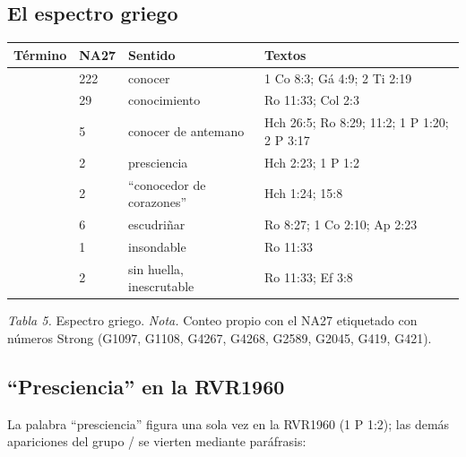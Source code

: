\subsection{El espectro griego}

\begin{center}\small\renewcommand{\arraystretch}{1.2}
\begin{tabular}{@{}L{3.0cm}L{1.0cm}L{4.4cm}L{6.0cm}@{}}
\toprule
\textbf{Término} & \textbf{NA27} & \textbf{Sentido} & \textbf{Textos} \\ \midrule
{} & 222 & conocer & 1 Co 8:3; Gá 4:9; 2 Ti 2:19 \\
 & 29 & conocimiento & Ro 11:33; Col 2:3 \\
 & 5 & conocer de antemano & Hch 26:5; Ro 8:29; 11:2; 1 P 1:20; 2 P 3:17 \\
 & 2 & presciencia & Hch 2:23; 1 P 1:2 \\
 & 2 & ``conocedor de corazones'' & Hch 1:24; 15:8 \\
 & 6 & escudriñar & Ro 8:27; 1 Co 2:10; Ap 2:23 \\
 & 1 & insondable & Ro 11:33 \\
 & 2 & sin huella, inescrutable & Ro 11:33; Ef 3:8 \\
\bottomrule
\end{tabular}\par
{\footnotesize\color{gris}\textit{Tabla 5.} Espectro griego. \textit{Nota.} Conteo propio con el NA27 etiquetado con números Strong (G1097, G1108, G4267, G4268, G2589, G2045, G419, G421).}
\end{center}

\subsection{“Presciencia” en la RVR1960}
La palabra ``presciencia'' figura una sola vez en la RVR1960 (1 P 1:2); las demás apariciones del grupo / se vierten mediante paráfrasis:

